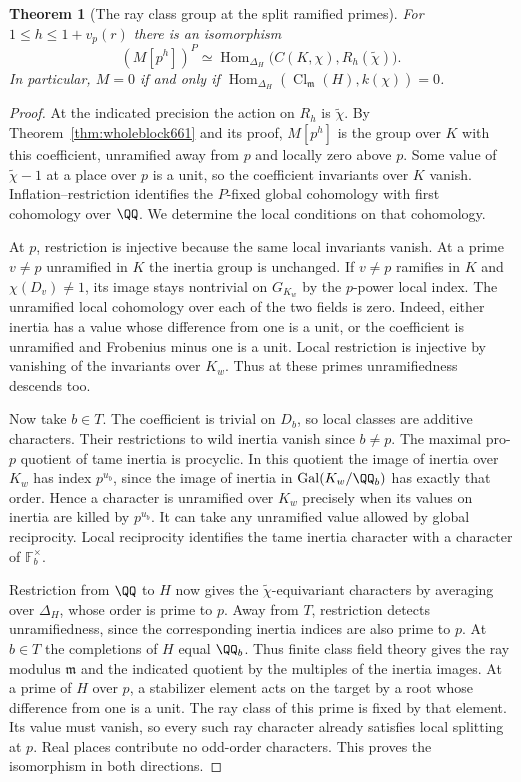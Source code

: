 \documentclass[a4paper,11pt]{article}
\newtheorem{theorem}[proposition]{Theorem}
\theoremstyle{definition}
\theoremstyle{remark}
\numberwithin{equation}{section}
\newcommand{\Cl}{\operatorname{Cl}}
\begin{document}
\begin{theorem}[The ray class group at the split ramified primes]
\leavevmode\label{thm:tameray662}
For \(1\le h\le1+v_p(r)\) there is an isomorphism
\[
 (M[p^h])^P \simeq
 \operatorname{Hom}_{\Delta_H}
                \big(C(K,\chi), R_h(\widetilde\chi)\big).
\]
In particular, \(M=0\) if and only if
\(\operatorname{Hom}_{\Delta_H}(\Cl_{\mathfrak m}(H),k(\chi))=0\).
\end{theorem}
\begin{proof}
At the indicated precision the action on \(R_h\) is
\(\widetilde\chi\). By Theorem~\ref{thm:wholeblock661} and its
proof, \(M[p^h]\) is the group over \(K\) with this coefficient,
unramified away from \(p\) and locally zero above \(p\).
Some value of \(\widetilde\chi-1\) at a place over \(p\) is a
unit, so the coefficient invariants over \(K\) vanish.
Inflation--restriction identifies the \(P\)-fixed global
cohomology with first cohomology over \(\QQ\). We determine the
local conditions on that cohomology.

At \(p\), restriction is injective because the same local
invariants vanish. At a prime \(v\ne p\) unramified in \(K\) the
inertia group is unchanged. If \(v\ne p\) ramifies in \(K\) and
\(\chi(D_v)\ne1\), its image stays nontrivial on \(G_{K_w}\)
by the \(p\)-power local index. The unramified local cohomology
over each of the two fields is zero. Indeed, either inertia
has a value whose difference from one is a unit, or the
coefficient is unramified and Frobenius minus one is a unit.
Local restriction is injective by vanishing of the invariants
over \(K_w\). Thus at these primes unramifiedness descends too.

Now take \(b\in T\). The coefficient is trivial on \(D_b\),
so local classes are additive characters. Their restrictions
to wild inertia vanish since \(b\ne p\). The maximal pro-\(p\)
quotient of tame inertia is procyclic. In this quotient the
image of inertia over \(K_w\) has index \(p^{u_b}\), since
the image of inertia in \(\operatorname{Gal}(K_w/\QQ_b)\) has
exactly that order. Hence a character is unramified over \(K_w\)
precisely when its values on inertia are killed by \(p^{u_b}\).
It can take any unramified value allowed by global reciprocity.
Local reciprocity identifies the tame inertia character with a
character of \(\mathbb F_b^\times\).

Restriction from \(\QQ\) to \(H\) now gives the
\(\widetilde\chi\)-equivariant characters by averaging over
\(\Delta_H\), whose order is prime to \(p\). Away from \(T\),
restriction detects unramifiedness, since the corresponding
inertia indices are also prime to \(p\). At \(b\in T\) the
completions of \(H\) equal \(\QQ_b\). Thus finite class field
theory gives the ray modulus \(\mathfrak m\) and the indicated
quotient by the multiples of the inertia images. At a prime of
\(H\) over \(p\), a stabilizer element acts on the target by a root
whose difference from one is a unit. The ray class of this prime
is fixed by that element. Its value must vanish, so every such
ray character already satisfies local splitting at \(p\).
Real places contribute no odd-order characters. This proves the
isomorphism in both directions.


\end{proof}
\end{document}
